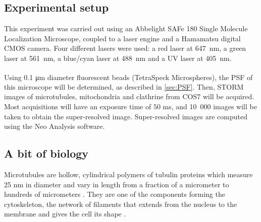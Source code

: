 \subsection{Experimental setup} \label{sec:experimental_setup}
This experiment was carried out using an Abbelight SAFe 180 Single Molecule Localization Microscope, coupled to a laser engine and a Hamamatsu digital CMOS camera. Four different lasers were used: a red laser at \mbox{647 nm}, a green laser at \mbox{561 nm}, a blue/cyan laser at \mbox{488 nm} and a UV laser at \mbox{405 nm}.

Using 0.1 \si{\micro\meter} diameter fluorescent beads (TetraSpeck\textsuperscript{\texttrademark} Microspheres), the PSF of this microscope will be determined, as described in \autoref{sec:PSF}. Then, STORM images of microtubules, mitochondria and clathrine from COS7 will be acquired. Most acquisitions will have an exposure time of $50$ ms, and \mbox{10 000} images will be taken to obtain the super-resolved image. Super-resolved images are computed using the Neo Analysis software.

\subsection{A bit of biology} \label{sec:biology}
Microtubules are hollow, cylindrical polymers of tubulin proteins which measure 25 nm
in diameter and vary in length from a fraction of a micrometer to hundreds of micrometers \cite{lodish_molecular_2004}.
They are one of the components forming the cytoskeleton, the network of filaments that extends from the nucleus to the membrane and gives the cell its shape \cite{douglass_notice_2023}.